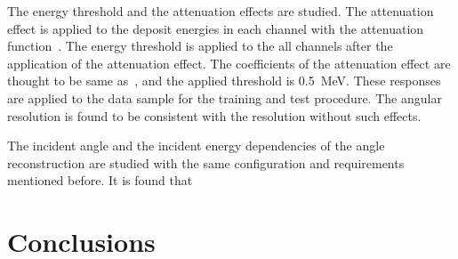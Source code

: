 \documentclass[jkps,preprint,fleqn,showpacs,showkeys]{revtex4}
\begin{document}
The energy threshold and the attenuation effects are studied. The attenuation effect is applied to the deposit energies in each channel with the attenuation function~\cite{Murayama:2020mcp}. The energy threshold is applied to the all channels after the application of the attenuation effect. The coefficients of the attenuation effect are thought to be same as~\cite{Murayama:2020mcp}, and the applied threshold is 0.5~MeV. These responses are applied to the data sample for the training and test procedure. The angular resolution is found to be consistent with the resolution without such effects.



The incident angle and the incident energy dependencies of the angle reconstruction are studied with the same configuration and requirements mentioned before. It is found that 




\section{Conclusions}

\label{sec:con}



\begin{acknowledgments}
\end{acknowledgments}


\end{document}

